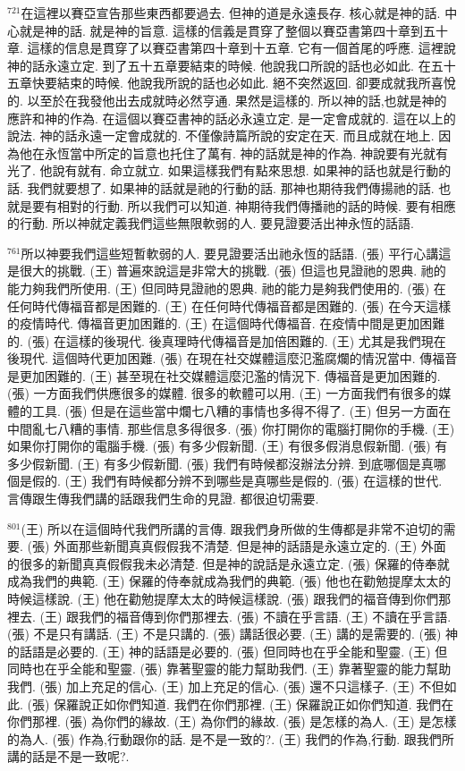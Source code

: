 \documentclass{book}
\begin{document}
$^{721}$在這裡以賽亞宣告那些東西都要過去.
但神的道是永遠長存.
核心就是神的話.
中心就是神的話.
就是神的旨意.
這樣的信義是貫穿了整個以賽亞書第四十章到五十章.
這樣的信息是貫穿了以賽亞書第四十章到十五章.
它有一個首尾的呼應.
這裡說神的話永遠立定.
到了五十五章要結束的時候.
他說我口所說的話也必如此.
在五十五章快要結束的時候.
他說我所說的話也必如此.
絕不突然返回.
卻要成就我所喜悅的.
以至於在我發他出去成就時必然亨通.
果然是這樣的.
所以神的話,也就是神的應許和神的作為.
在這個以賽亞書神的話必永遠立定.
是一定會成就的.
這在以上的說法.
神的話永遠一定會成就的.
不僅像詩篇所說的安定在天.
而且成就在地上.
因為他在永恆當中所定的旨意也托住了萬有.
神的話就是神的作為.
神說要有光就有光了.
他說有就有.
命立就立.
如果這樣我們有點來思想.
如果神的話也就是行動的話.
我們就要想了.
如果神的話就是祂的行動的話.
那神也期待我們傳揚祂的話.
也就是要有相對的行動.
所以我們可以知道.
神期待我們傳播祂的話的時候.
要有相應的行動.
所以神就定義我們這些無限軟弱的人.
要見證要活出神永恆的話語.

$^{761}$所以神要我們這些短暫軟弱的人.
要見證要活出祂永恆的話語.
(張) 平行心講這是很大的挑戰.
(王) 普遍來說這是非常大的挑戰.
(張) 但這也見證祂的恩典.
祂的能力夠我們所使用.
(王) 但同時見證祂的恩典.
祂的能力是夠我們使用的.
(張) 在任何時代傳福音都是困難的.
(王) 在任何時代傳福音都是困難的.
(張) 在今天這樣的疫情時代.
傳福音更加困難的.
(王) 在這個時代傳福音.
在疫情中間是更加困難的.
(張) 在這樣的後現代.
後真理時代傳福音是加倍困難的.
(王) 尤其是我們現在後現代.
這個時代更加困難.
(張) 在現在社交媒體這麼氾濫腐爛的情況當中.
傳福音是更加困難的.
(王) 甚至現在社交媒體這麼氾濫的情況下.
傳福音是更加困難的.
(張) 一方面我們供應很多的媒體.
很多的軟體可以用.
(王) 一方面我們有很多的媒體的工具.
(張) 但是在這些當中爛七八糟的事情也多得不得了.
(王) 但另一方面在中間亂七八糟的事情.
那些信息多得很多.
(張) 你打開你的電腦打開你的手機.
(王) 如果你打開你的電腦手機.
(張) 有多少假新聞.
(王) 有很多假消息假新聞.
(張) 有多少假新聞.
(王) 有多少假新聞.
(張) 我們有時候都沒辦法分辨.
到底哪個是真哪個是假的.
(王) 我們有時候都分辨不到哪些是真哪些是假的.
(張) 在這樣的世代.
言傳跟生傳我們講的話跟我們生命的見證.
都很迫切需要.

$^{801}$(王) 所以在這個時代我們所講的言傳.
跟我們身所做的生傳都是非常不迫切的需要.
(張) 外面那些新聞真真假假我不清楚.
但是神的話語是永遠立定的.
(王) 外面的很多的新聞真真假假我未必清楚.
但是神的說話是永遠立定.
(張) 保羅的侍奉就成為我們的典範.
(王) 保羅的侍奉就成為我們的典範.
(張) 他也在勸勉提摩太太的時候這樣說.
(王) 他在勸勉提摩太太的時候這樣說.
(張) 跟我們的福音傳到你們那裡去.
(王) 跟我們的福音傳到你們那裡去.
(張) 不讀在乎言語.
(王) 不讀在乎言語.
(張) 不是只有講話.
(王) 不是只講的.
(張) 講話很必要.
(王) 講的是需要的.
(張) 神的話語是必要的.
(王) 神的話語是必要的.
(張) 但同時也在乎全能和聖靈.
(王) 但同時也在乎全能和聖靈.
(張) 靠著聖靈的能力幫助我們.
(王) 靠著聖靈的能力幫助我們.
(張) 加上充足的信心.
(王) 加上充足的信心.
(張) 還不只這樣子.
(王) 不但如此.
(張) 保羅說正如你們知道.
我們在你們那裡.
(王) 保羅說正如你們知道.
我們在你們那裡.
(張) 為你們的緣故.
(王) 為你們的緣故.
(張) 是怎樣的為人.
(王) 是怎樣的為人.
(張) 作為,行動跟你的話.
是不是一致的?.
(王) 我們的作為,行動.
跟我們所講的話是不是一致呢?.
\end{document}
